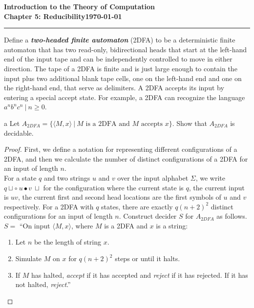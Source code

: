 \documentclass[11pt]{article}
\newcommand{\dated}{\today}
\begin{document}
\textbf{Introduction to the Theory of
Computation}\hfill\textbf{\myname}\\[0.01in]
\textbf{Chapter 5: Reducibility}\hfill\textbf{\dated}\\
\smallskip\hrule\bigskip

\begin{problem}{5.26}
Define a \textbf{\textit{two-headed finite automaton}} (2DFA) to be a deterministic finite automaton that has two read-only, bidirectional heads that start at the left-hand end of the input tape and can be independently controlled to move in either direction. The tape of a 2DFA is finite and is just large enough to contain the input plus two additional blank tape cells, one on the left-hand end and one on the right-hand end, that serve as delimiters. A 2DFA accepts its input by entering a special accept state. For example, a 2DFA can recognize the language ${a^nb^nc^n \ | \ n \geq 0}$.
\end{problem}

\begin{problem}[Part]{a}
Let $A_{2DFA} = \{\langle M, x \rangle \ | \ M \text{ is a 2DFA and } M \text{ accepts } x\}$. Show that $A_{2DFA}$ is decidable.
\end{problem}

\begin{proof}
First, we define a notation for representing different configurations of a 2DFA, and then we calculate the number of distinct configurations of a 2DFA for an input of length $n$. \\

For a state $q$ and two strings $u$ and $v$ over the input alphabet $\Sigma$, we write $q \sqcup \circ \ u \bullet v \ \sqcup$ for the configuration  where the current state is $q$, the current input is $uv$, the current first and second head locations are the first symbols of $u$ and $v$ respectively. For a 2DFA with $q$ states, there are exactly $q(n + 2)^2$ distinct configurations for an input of length $n$. Construct decider $S$ for $A_{2DFA}$ as follows. \\

$S =$ \textquotedblleft On input $\langle M, x \rangle$, where $M$ is a 2DFA and $x$ is a string:
\begin{enumerate}
\item Let $n$ be the length of string $x$.
\item Simulate $M$ on $x$ for $q(n + 2)^2$ steps or until it halts.
\item If $M$ has halted, \textit{accept} if it has accepted and \textit{reject} if it has rejected. If it has not halted, \textit{reject}.\textquotedblright
\end{enumerate}
\end{proof}
\end{document}
